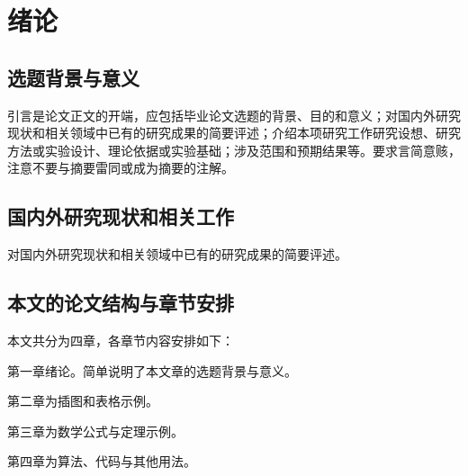 
\chapter{绪论}
\label{cha:introduction}
\section{选题背景与意义}
\label{sec:background}
引言是论文正文的开端，应包括毕业论文选题的背景、目的和意义；对国内外研究现状和相关领域中已有的研究成果的简要评述；介绍本项研究工作研究设想、研究方法或实验设计、理论依据或实验基础；涉及范围和预期结果等。要求言简意赅，注意不要与摘要雷同或成为摘要的注解。

\section{国内外研究现状和相关工作}
\label{sec:related_work}
对国内外研究现状和相关领域中已有的研究成果的简要评述。
\section{本文的论文结构与章节安排}

\label{sec:arrangement}

本文共分为四章，各章节内容安排如下：

第一章绪论。简单说明了本文章的选题背景与意义。

第二章为插图和表格示例。

第三章为数学公式与定理示例。

第四章为算法、代码与其他用法。

